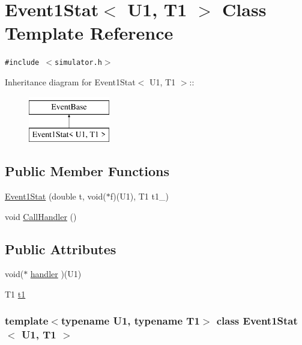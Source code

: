 \hypertarget{classEvent1Stat}{
\section{Event1Stat$<$ U1, T1 $>$ Class Template Reference}
\label{classEvent1Stat}
}
{\tt \#include $<$simulator.h$>$}

Inheritance diagram for Event1Stat$<$ U1, T1 $>$::\begin{figure}[H]
\begin{center}
\leavevmode
\includegraphics[height=2cm]{classEvent1Stat}
\end{center}
\end{figure}
\subsection*{Public Member Functions}
\begin{CompactItemize}
\item 
\hyperlink{classEvent1Stat_18fbb4bda5eec5c76b184c1905e6a51b}{Event1Stat} (double t, void($\ast$f)(U1), T1 t1\_)
\item 
void \hyperlink{classEvent1Stat_d39942fb840e55ee829decdf1927eadf}{CallHandler} ()
\end{CompactItemize}
\subsection*{Public Attributes}
\begin{CompactItemize}
\item 
void($\ast$ \hyperlink{classEvent1Stat_d5c1915ba5261468e90f35d2e4200af7}{handler} )(U1)
\item 
T1 \hyperlink{classEvent1Stat_d8c7245671d807e6ffe5fefb08a1345c}{t1}
\end{CompactItemize}
\subsubsection*{template$<$typename U1, typename T1$>$ class Event1Stat$<$ U1, T1 $>$}



